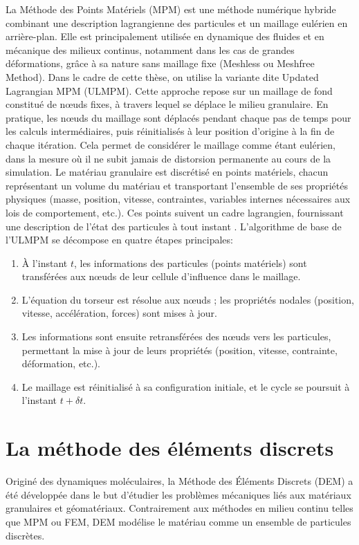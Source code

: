 \documentclass[a4paper,12pt]{report}
\begin{document}
La Méthode des Points Matériels (MPM) est une méthode numérique hybride combinant une description lagrangienne des particules et un maillage eulérien en arrière-plan. Elle est principalement utilisée en dynamique des fluides et en mécanique des milieux continus, notamment dans les cas de grandes déformations, grâce à sa nature sans maillage fixe (Meshless ou Meshfree Method).
Dans le cadre de cette thèse, on utilise la variante dite Updated Lagrangian MPM (ULMPM). Cette approche repose sur un maillage de fond constitué de n\oe uds fixes, à travers lequel se déplace le milieu granulaire. En pratique, les n\oe uds du maillage sont déplacés pendant chaque pas de temps pour les calculs intermédiaires, puis réinitialisés à leur position d’origine à la fin de chaque itération. Cela permet de considérer le maillage comme étant eulérien, dans la mesure où il ne subit jamais de distorsion permanente au cours de la simulation.
Le matériau granulaire est discrétisé en points matériels, chacun représentant un volume du matériau et transportant l’ensemble de ses propriétés physiques (masse, position, vitesse, contraintes, variables internes nécessaires aux lois de comportement, etc.). Ces points suivent un cadre lagrangien, fournissant une description de l’état des particules à tout instant \citep{danies2018application}.
L’algorithme de base de l’ULMPM se décompose en quatre étapes principales:

\begin{enumerate}
  \item À l’instant $t$, les informations des particules (points matériels) sont transférées aux n\oe uds de leur cellule d’influence dans le maillage.
  \item L’équation du torseur est résolue aux n\oe uds ; les propriétés nodales (position, vitesse, accélération, forces) sont mises à jour.
  \item Les informations sont ensuite retransférées des n\oe uds vers les particules, permettant la mise à jour de leurs propriétés (position, vitesse, contrainte, déformation, etc.).
  \item Le maillage est réinitialisé à sa configuration initiale, et le cycle se poursuit à l’instant $t + \delta t$.
\end{enumerate}


\section{La méthode des éléments discrets}
Originé des dynamiques moléculaires, la Méthode des Éléments Discrets (DEM) a été développée dans le but d'étudier les problèmes mécaniques liés aux matériaux granulaires et géomatériaux. Contrairement aux méthodes en milieu continu telles que MPM ou FEM, DEM modélise le matériau comme un ensemble de particules discrètes.
\end{document}
